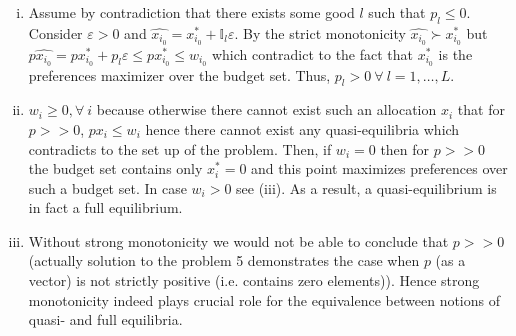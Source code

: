\documentclass[a4paper]{article}
\begin{document}
\begin{enumerate}[(i)]
	\item Assume by contradiction that there exists some good $l$ such that $p_l \le 0$. Consider $\varepsilon > 0$ and $\hat{x_{i_0}} = x_{i_0}^* + \mathbb{I}_l\varepsilon$. By the strict monotonicity $\hat{x_{i_0}} \succ x_{i_0}^*$ but $p\hat{x_{i_0}} = px_{i_0}^* + p_l\varepsilon \le px_{i_0}^* \le w_{i_0}$ which contradict to the fact that $x_{i_0}^*$ is the preferences maximizer over the budget set. Thus, $p_l > 0\ \forall\ l = 1, \dots, L$. 
	\item $w_i \ge 0, \forall\ i$ because otherwise there cannot exist such an allocation $x_i$ that for $p >> 0$, $px_i \le w_i$ hence there cannot exist any quasi-equilibria which contradicts to the set up of the problem. Then, if $w_i = 0$ then for $p >> 0$ the budget set contains only $x_i^* = 0$ and this point maximizes preferences over such a budget set. In case $w_i > 0$ see (iii). As a result, a quasi-equilibrium is in fact a full equilibrium.
	\item Without strong monotonicity we would not be able to conclude that $p >> 0$ (actually solution to the problem 5 demonstrates the case when $p$ (as a vector) is not strictly positive (i.e. contains zero elements)). Hence strong monotonicity indeed plays crucial role for the equivalence between notions of quasi- and full equilibria.
\end{enumerate}
\end{document}
